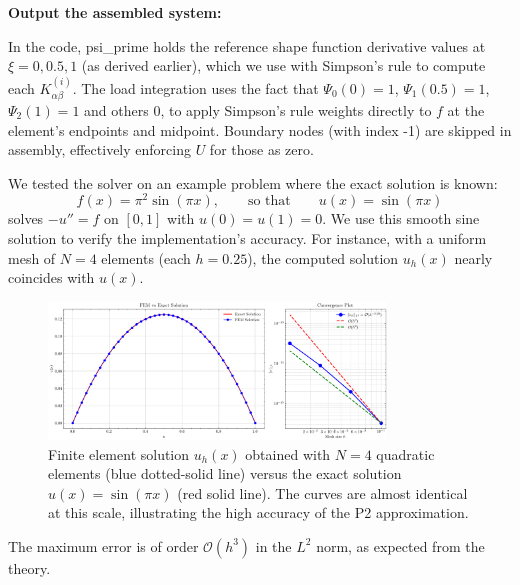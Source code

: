 \documentclass[a4paper,10pt]{article}
\begin{document}
\begin{algorithm}[H]
{	\BlankLine
	}
	\BlankLine

	\textbf{Output the assembled system:}\\

\end{algorithm}

In the code, psi\_prime holds the reference shape function derivative values at $\xi=0,0.5,1$ (as derived earlier), which we use with Simpson's rule to compute each $K^{(i)}_{\alpha\beta}$. 
The load integration uses the fact that $\Psi_0(0)=1$, $\Psi_1(0.5)=1$, $\Psi_2(1)=1$ and others 0, to apply Simpson's rule weights directly to $f$ at the element's endpoints and midpoint. 
Boundary nodes (with index -1) are skipped in assembly, effectively enforcing $U$ for those as zero.

We tested the solver on an example problem where the exact solution is known:
$$ f(x) = \pi^2 \sin(\pi x), \qquad \text{so that}\qquad u(x) = \sin(\pi x) $$
solves $-u''=f$ on $[0,1]$ with $u(0)=u(1)=0$. 
We use this smooth sine solution to verify the implementation's accuracy. 
For instance, with a uniform mesh of $N=4$ elements (each $h=0.25$), the computed solution $u_h(x)$ nearly coincides with $u(x)$. 
\begin{figure}[H]
	\centering
	\includegraphics[width=0.8\textwidth]{figures/fem_solution_20_1.png}
	\caption{Finite element solution $u_h(x)$ obtained with $N=4$ quadratic elements (blue dotted-solid line) versus the exact solution $u(x)=\sin(\pi x)$ (red solid line). 
	The curves are almost identical at this scale, illustrating the high accuracy of the P2 approximation.}
\end{figure}
The maximum error is of order \(\mathcal{O}(h^3)\) in the \(L^2\) norm, as expected from the theory.
\end{document}
